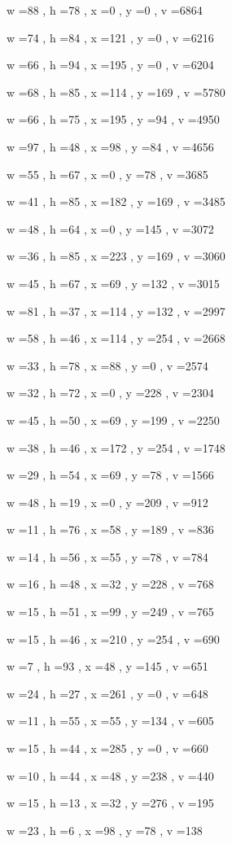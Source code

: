 \documentclass[11pt]{article}
\begin{document}
w =88 , h =78 , x =0 , y =0 , v =6864
\par
w =74 , h =84 , x =121 , y =0 , v =6216
\par
w =66 , h =94 , x =195 , y =0 , v =6204
\par
w =68 , h =85 , x =114 , y =169 , v =5780
\par
w =66 , h =75 , x =195 , y =94 , v =4950
\par
w =97 , h =48 , x =98 , y =84 , v =4656
\par
w =55 , h =67 , x =0 , y =78 , v =3685
\par
w =41 , h =85 , x =182 , y =169 , v =3485
\par
w =48 , h =64 , x =0 , y =145 , v =3072
\par
w =36 , h =85 , x =223 , y =169 , v =3060
\par
w =45 , h =67 , x =69 , y =132 , v =3015
\par
w =81 , h =37 , x =114 , y =132 , v =2997
\par
w =58 , h =46 , x =114 , y =254 , v =2668
\par
w =33 , h =78 , x =88 , y =0 , v =2574
\par
w =32 , h =72 , x =0 , y =228 , v =2304
\par
w =45 , h =50 , x =69 , y =199 , v =2250
\par
w =38 , h =46 , x =172 , y =254 , v =1748
\par
w =29 , h =54 , x =69 , y =78 , v =1566
\par
w =48 , h =19 , x =0 , y =209 , v =912
\par
w =11 , h =76 , x =58 , y =189 , v =836
\par
w =14 , h =56 , x =55 , y =78 , v =784
\par
w =16 , h =48 , x =32 , y =228 , v =768
\par
w =15 , h =51 , x =99 , y =249 , v =765
\par
w =15 , h =46 , x =210 , y =254 , v =690
\par
w =7 , h =93 , x =48 , y =145 , v =651
\par
w =24 , h =27 , x =261 , y =0 , v =648
\par
w =11 , h =55 , x =55 , y =134 , v =605
\par
w =15 , h =44 , x =285 , y =0 , v =660
\par
w =10 , h =44 , x =48 , y =238 , v =440
\par
w =15 , h =13 , x =32 , y =276 , v =195
\par
w =23 , h =6 , x =98 , y =78 , v =138
\par
\newpage
\end{document}
